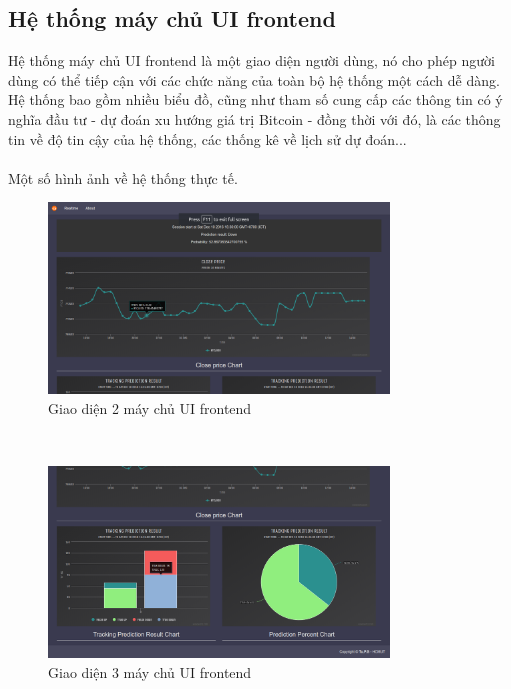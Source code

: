 \subsection{Hệ thống máy chủ UI frontend}
Hệ thống máy chủ UI frontend là một giao diện người dùng, nó cho phép người 
dùng có thể tiếp cận với các chức năng của toàn bộ hệ thống một cách dễ dàng. 
Hệ thống bao gồm nhiều biểu đồ, cũng như tham số cung cấp các thông tin có ý 
nghĩa đầu tư - dự đoán xu hướng giá trị Bitcoin - đồng thời với đó, là các 
thông tin về độ tin cậy của hệ thống, các thống kê về lịch sử dự đoán...\\\\
Một số hình ảnh về hệ thống thực tế.\\
\begin{figure}[h!]
\centering
\includegraphics[height=2in, keepaspectratio=true]{2.png}
\caption{Giao diện 2 máy chủ UI frontend}
\end{figure}\\
\begin{figure}[h!]
\centering
\includegraphics[height=2in, keepaspectratio=true]{3.png}
\caption{Giao diện 3 máy chủ UI frontend}
\end{figure}\\\\